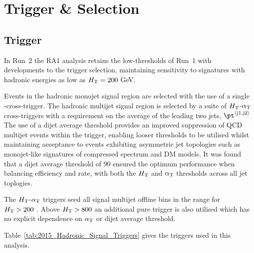 \section{Trigger \& Selection}
\label{selection}

\subsection{Trigger}


In Run~2 the RA1 analysis retains the low-thresholds of Run~1 with developments 
to the trigger selection, maintaining sensitivity to signatures with hadronic 
energies as low as $\mbox{$H_\text{T}$} = 200$ GeV. 


Events in the hadronic monojet signal region are selected with the use of a single \mht-\met cross-trigger.
The hadronic multijet signal region is selected by a suite of $\mbox{$H_\text{T}$}$-$\alpha_{\text{T}}$ cross-triggers 
with a requirement on the average \pt of the leading two jets, $\pt^{\rm \left<j1,j2\right>}$
The use of a dijet average threshold provides an improved  suppression of QCD multijet events within the trigger,
enabling looser \alphat thresholds to be utilised whilst maintaining acceptance to events exhibiting asymmetric jet 
topologies such as monojet-like signatures of compressed spectrum and DM models. It was found that a dijet average
threshold of 90 \GeV ensured the optimum performance when balancing efficiency and rate, with both the $\mbox{$H_\text{T}$}$ and $\alpha_{\text{T}}$
thresholds across all jet toplogies. 

The $\mbox{$H_\text{T}$}$-$\alpha_{\text{T}}$ triggers seed all signal multijet offline bins in the range for $\mbox{$H_\text{T}$} > 200$ \GeV. 
Above $\mbox{$H_\text{T}$} > 800$ an additional pure \scalht trigger is also utilised which has
 no explicit dependence on $\alpha_{\text{T}}$ or dijet average threshold. 

Table~\ref{tab:2015_Hadronic_Signal_Triggers} gives the triggers used in this analysis.



